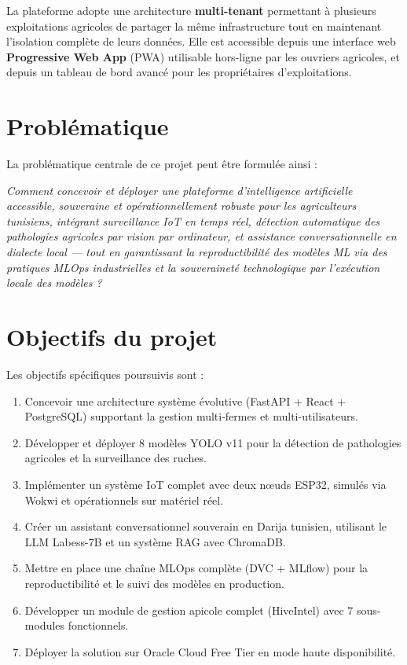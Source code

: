 La plateforme adopte une architecture \textbf{multi-tenant} permettant à plusieurs
exploitations agricoles de partager la même infrastructure tout en maintenant
l'isolation complète de leurs données. Elle est accessible depuis une interface web
\textbf{Progressive Web App} (PWA) utilisable hors-ligne par les ouvriers agricoles,
et depuis un tableau de bord avancé pour les propriétaires d'exploitations.

\section{Problématique}

La problématique centrale de ce projet peut être formulée ainsi :

\begin{tcolorbox}[warningbox, title={Problématique}]
\textit{Comment concevoir et déployer une plateforme d'intelligence artificielle
accessible, souveraine et opérationnellement robuste pour les agriculteurs tunisiens,
intégrant surveillance IoT en temps réel, détection automatique des pathologies agricoles
par vision par ordinateur, et assistance conversationnelle en dialecte local — tout en
garantissant la reproductibilité des modèles ML via des pratiques MLOps industrielles
et la souveraineté technologique par l'exécution locale des modèles ?}
\end{tcolorbox}

\section{Objectifs du projet}

Les objectifs spécifiques poursuivis sont :

\begin{enumerate}
  \item Concevoir une architecture système évolutive (FastAPI + React + PostgreSQL) supportant
        la gestion multi-fermes et multi-utilisateurs.
  \item Développer et déployer 8 modèles YOLO v11 pour la détection de pathologies
        agricoles et la surveillance des ruches.
  \item Implémenter un système IoT complet avec deux nœuds ESP32, simulés via Wokwi et
        opérationnels sur matériel réel.
  \item Créer un assistant conversationnel souverain en Darija tunisien, utilisant le LLM
        Labess-7B et un système RAG avec ChromaDB.
  \item Mettre en place une chaîne MLOps complète (DVC + MLflow) pour la reproductibilité
        et le suivi des modèles en production.
  \item Développer un module de gestion apicole complet (HiveIntel) avec 7 sous-modules
        fonctionnels.
  \item Déployer la solution sur Oracle Cloud Free Tier en mode haute disponibilité.
\end{enumerate}

